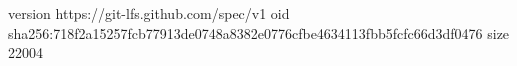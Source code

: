 version https://git-lfs.github.com/spec/v1
oid sha256:718f2a15257fcb77913de0748a8382e0776cfbe4634113fbb5fcfc66d3df0476
size 22004
